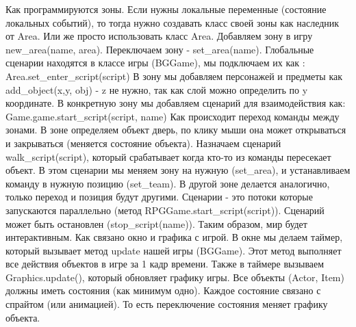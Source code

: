 Как программируются зоны. Если нужны локальные переменные (состояние локальных событий), то тогда нужно создавать класс своей зоны как наследник от Area. Или же просто использовать класс Area. Добавляем зону в игру new\_area(name, area). Переключаем зону - set\_area(name). Глобальные сценарии находятся в классе игры (BGGame), мы подключаем их как :
Area.set\_enter\_script(script)
В зону мы добавляем персонажей и предметы как add\_object(x,y, obj) - z не нужно, так как слой можно определить по y координате.
В конкретную зону мы добавляем сценарий для взаимодействия как: Game.game.start\_script(script, name)
Как происходит переход команды между зонами.
В зоне определяем объект дверь, по клику мыши она может открываться и закрываться (меняется состояние объекта). Назначаем сценарий walk\_script(script), который срабатывает когда кто-то из команды пересекает объект. В этом сценарии мы меняем зону на нужную (set\_area), и устанавливаем команду в нужную позицию (set\_team). В другой зоне делается аналогично, только переход и позиция будут другими.
Сценарии - это потоки которые запускаются параллельно (метод RPGGame.start\_script(script)). Сценарий может быть остановлен (stop\_script(name)).
Таким образом, мир будет интерактивным.
Как связано окно и графика с игрой. В окне мы делаем таймер, который вызывает метод update нашей игры (BGGame). Этот метод выполняет все действия объектов в игре за 1 кадр времени.
Также в таймере вызываем Graphics.update(), который обновляет графику игры.
Все объекты (Actor, Item) должны иметь состояния (как минимум одно). Каждое состояние связано с спрайтом (или анимацией). То есть переключение состояния меняет графику объекта.

